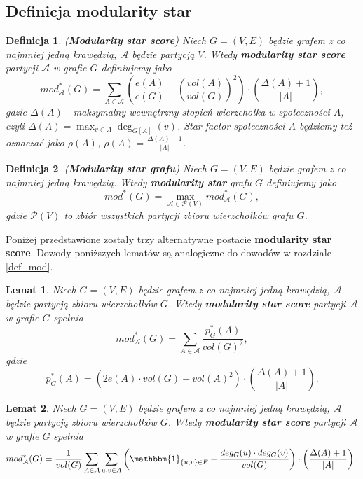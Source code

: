 \documentclass[letterpaper,12pt]{article}
\newtheorem{definition}{Definicja}
\newtheorem{lemma}{Lemat}
\begin{document}
\subsection{Definicja modularity star}
\begin{definition}
  (\textbf{Modularity star score}) Niech \(G = (V, E)\) będzie grafem z co najmniej jedną krawędzią, \(\mathcal{A}\) będzie partycją \(V\). Wtedy \textbf{modularity star score} partycji \(\mathcal{A}\) w grafie \(G\) definiujemy jako
  \[
    mod^*_{\mathcal{A}}(G) = \sum_{A \in \mathcal{A}} \left(\frac{e(A)}{e(G)} - {\left(\frac{vol(A)}{vol(G)}\right)}^2\right) \cdot \left(\frac{\Delta(A) + 1}{|A|}\right),
  \]
  gdzie \(\Delta(A)\) - maksymalny wewnętrzny stopień wierzchołka w społeczności \(A\), czyli \(\Delta(A) = \max_{v \in A} \deg_{G[A]} (v)\).
  Star factor społeczności \(A\) będziemy też oznaczać jako \(\rho(A)\),  \(\rho(A) = \frac{\Delta(A) + 1}{|A|}\).\\
\end{definition}

\begin{definition}
  (\textbf{Modularity star grafu}) Niech \(G = (V, E)\) będzie grafem z co najmniej jedną krawędzią. Wtedy \textbf{modularity star} grafu \(G\) definiujemy jako
  \[
    mod^*(G) = \max_{\mathcal{A} \in \mathcal{P}(V)} mod^*_{\mathcal{A}}(G),
  \]
  gdzie \(\mathcal{P}(V)\) to zbiór wszystkich partycji zbioru wierzchołków grafu \(G\).
\end{definition}

Poniżej przedstawione zostały trzy alternatywne postacie \textbf{modularity star score}. Dowody poniższych lematów są analogiczne do dowodów w rozdziale \ref{def_mod}.
\begin{lemma}
  \label{score_pg_star}
  Niech \(G = (V, E)\) będzie grafem z co najmniej jedną krawędzią, \(\mathcal{A}\) będzie partycją zbioru wierzchołków \(G\). Wtedy \textbf{modularity star score} partycji \(\mathcal{A}\) w grafie \(G\) spełnia
  \[mod_{\mathcal{A}}^*(G) = \sum_{A \in \mathcal{A}} \frac{p_G^*(A)}{vol(G)^2},\]
  gdzie
  \[p_G^*(A) = \left(2e(A) \cdot vol(G) - {vol(A)}^2\right) \cdot \left(\frac{\Delta(A) + 1}{|A|}\right).\]
\end{lemma}

\begin{lemma}
  \label{score_deg_star}
  Niech \(G = (V, E)\) będzie grafem z co najmniej jedną krawędzią, \(\mathcal{A}\) będzie partycją zbioru wierzchołków \(G\). Wtedy \textbf{modularity star score} partycji \(\mathcal{A}\) w grafie \(G\) spełnia
  \[mod_{\mathcal{A}}^*(G) = \frac{1}{vol(G)}\sum_{A \in \mathcal{A}} \sum_{u,v \in A} \left( \mathbbm{1}_{\{u,v\} \in E} - \frac{deg_G(u) \cdot deg_G(v)}{vol(G)}\right) \cdot \left(\frac{\Delta(A) + 1}{|A|}\right).\]
\end{lemma}
\end{document}
